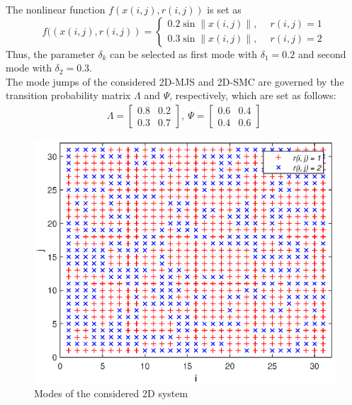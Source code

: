 \documentclass[conference]{IEEEtran}
\begin{document}
The nonlinear function $f(x(i,j),r(i,j))$ is set as
\begin{equation*}
	f((x(i,j),r(i,j)) = \begin{cases}
	0.2\sin{ \|x(i,j)\|}, \quad \ r(i,j)=1\\
	0.3\sin{ \|x(i,j)\|}, \quad \ r(i,j)=2
	\end{cases}
\end{equation*}
Thus, the parameter $\delta_{k}$ can be selected as first mode with $\delta_{1}=0.2$  and  second mode with $\delta_{2}=0.3$.\\
The mode jumps of the considered 2D-MJS and 2D-SMC are governed by the transition probability matrix  $\varLambda$ and $\varPsi$, respectively, which are set as follows:
\begin{equation*}
\begin{aligned}
	\varLambda=\begin{bmatrix}
	0.8&0.2\\ 0.3&0.7
	\end{bmatrix}, \ 
	\varPsi = \begin{bmatrix}
	0.6&0.4\\ 0.4 &0.6
	\end{bmatrix}
\end{aligned}
\end{equation*}
\begin{figure}[!htb]
	\centering\includegraphics[scale=0.6]{./simulations/r_eps.eps}
	\caption{Modes of the considered  2D system}
	\label{fig1}
\end{figure}
\end{document}
